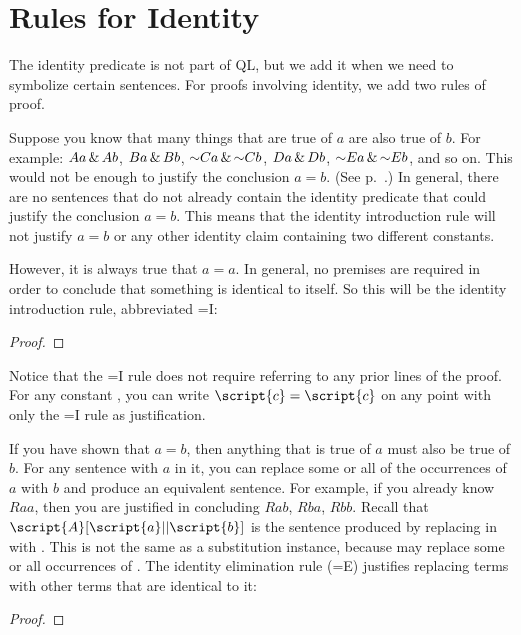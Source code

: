 
\section{Rules for Identity}
The identity predicate is not part of QL, but we add it when we need to symbolize certain sentences. For proofs involving identity, we add two rules of proof.

Suppose you know that many things that are true of $a$ are also true of $b$. For example: $Aa\,\&\, Ab$, $Ba\,\&\, Bb$, $\mathord{\sim} Ca\,\&\,\mathord{\sim} Cb$, $Da\,\&\, Db$, $\mathord{\sim} Ea\,\&\,\mathord{\sim} Eb$, and so on. This would not be enough to justify the conclusion $a=b$. (See p.~\pageref{model.nonidentity}.) In general, there are no sentences that do not already contain the identity predicate that could justify the conclusion $a=b$. This means that the identity introduction rule will not justify $a=b$ or any other identity claim containing two different constants.

However, it is always true that $a=a$. In general, no premises are required in order to conclude that something is identical to itself. So this will be the identity introduction rule, abbreviated {=}I:

\begin{proof}
	 
\end{proof}

Notice that the {=}I rule does not require referring to any prior lines of the proof. For any constant , you can write $\script{c}=\script{c}$ on any point with only the {=}I rule as justification.

If you have shown that $a=b$, then anything that is true of $a$ must also be true of $b$. For any sentence with $a$ in it, you can replace some or all of the occurrences of $a$ with $b$ and produce an equivalent sentence. For example, if you already know $Raa$, then you are justified in concluding $Rab$, $Rba$, $Rbb$. Recall that $\script{A}[\script{a}||\script{b}]$ is the sentence produced by replacing  in  with . This is not the same as a substitution instance, because  may replace some or all occurrences of . The identity elimination rule ({=}E) justifies replacing terms with other terms that are identical to it:
\begin{proof}
	 
	 
\end{proof}

